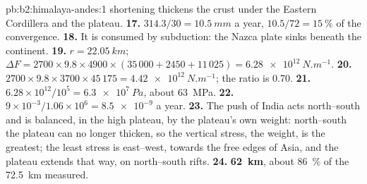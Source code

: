 \begin{solution}{pb:b2:himalaya-andes:1}
shortening thickens the crust under the Eastern Cordillera and the plateau.
\textbf{17.} $314.3/30 = \qty{10.5}{mm}$ a year, $10.5/72 = \qty{15}{\percent}$ of the
convergence.
\textbf{18.} It is consumed by subduction: the Nazca plate sinks beneath the continent.
\textbf{19.} $r = \qty{22.05}{km}$; $\Delta F = 2700\times9.8\times4900\times(35\,000 + 2450
+ 11\,025) = \qty{6.28e12}{N.m^{-1}}$.
\textbf{20.} $2700\times9.8\times3700\times45\,175 = \qty{4.42e12}{N.m^{-1}}$; the ratio is
0.70.
\textbf{21.} $6.28\times10^{12}/10^{5} = \qty{6.3e7}{Pa}$, about \qty{63}{MPa}.
\textbf{22.} $9\times10^{-3}/1.06\times10^{6} = \num{8.5e-9}$ a year.
\textbf{23.} The push of India acts north--south and is balanced, in the high plateau, by the
plateau's own weight: north--south the plateau can no longer thicken, so the vertical stress,
the weight, is the greatest; the least stress is east--west, towards the free edges of Asia,
and the plateau extends that way, on north--south rifts.
\textbf{24.} \textbf{\qty[text-series-to-math=true]{62}{km}}, about \qty{86}{\percent} of the
\qty{72.5}{km} measured.
\end{solution}
